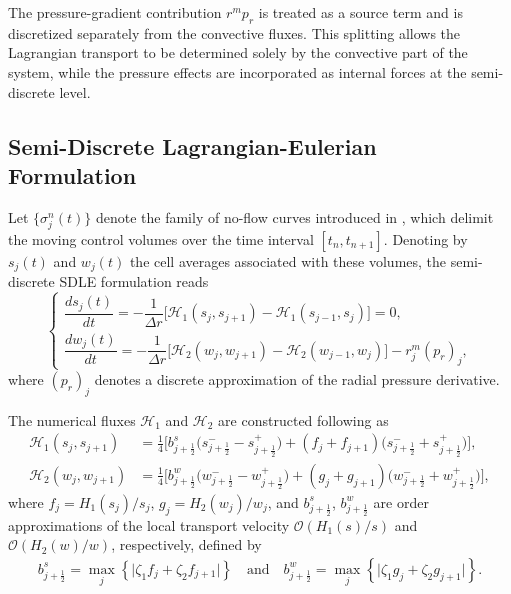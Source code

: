 \documentclass[11pt]{article}
\begin{document}
The pressure-gradient contribution $r^{m}p_{r}$ is treated as a source term and is discretized separately from the convective fluxes. This splitting allows the Lagrangian transport to be determined solely by the convective part of the system, while the pressure effects are incorporated as internal forces at the semi-discrete level.

\subsection*{Semi-Discrete Lagrangian-Eulerian Formulation}

Let $\{\sigma_j^n(t)\}$ denote the family of no-flow curves introduced in \cite{ABREU_LE_LINEAR}, which delimit the moving control volumes over the time interval $[t_n,t_{n+1}]$. Denoting by $s_j(t)$ and $w_j(t)$ the cell averages associated with these volumes, the semi-discrete SDLE formulation reads
\begin{equation}
\begin{cases}
\dfrac{d s_j(t)}{dt}
= -\dfrac{1}{\Delta r}\Big[\mathcal{H}_{1}(s_j,s_{j+1})
- \mathcal{H}_{1}(s_{j-1},s_j)\Big] = 0, \\[2mm]
\dfrac{d w_j(t)}{dt}
= -\dfrac{1}{\Delta r}\Big[\mathcal{H}_{2}(w_j,w_{j+1})
- \mathcal{H}_{2}(w_{j-1},w_j)\Big]
- r_j^{m}(p_r)_j,
\end{cases}
\label{eq:sdle-semidiscrete}
\end{equation}
where $(p_r)_j$ denotes a discrete approximation of the radial pressure derivative.

The numerical fluxes $\mathcal{H}_1$ and $\mathcal{H}_2$ are constructed following \cite{ABREU_LE_LINEAR} as
\begin{align}
\mathcal{H}_{1}(s_j,s_{j+1})
&= \frac{1}{4}\Big[
b^{s}_{j+\frac12}\big(s^{-}_{j+\frac12}-s^{+}_{j+\frac12}\big)
+ (f_j+f_{j+1})\big(s^{-}_{j+\frac12}+s^{+}_{j+\frac12}\big)
\Big], \label{eq:fluxle1}\\
\mathcal{H}_{2}(w_j,w_{j+1})
&= \frac{1}{4}\Big[
b^{w}_{j+\frac12}\big(w^{-}_{j+\frac12}-w^{+}_{j+\frac12}\big)
+ (g_j+g_{j+1})\big(w^{-}_{j+\frac12}+w^{+}_{j+\frac12}\big)
\Big], \label{eq:fluxle2}
\end{align}
where $f_j=H_1(s_j)/s_j$, $g_j=H_2(w_j)/w_j$, and $b^{s}_{j+\frac12}$, $b^{w}_{j+\frac12}$ are order approximations of the local transport velocity $\mathcal{O}(H_{1}(s)/s)$ and $\mathcal{O}(H_{2}(w)/w)$, respectively, defined by
\begin{align}
    b^{s}_{j+\frac12} = \displaystyle\max_{j}\left\{\vert \zeta_{1}f_{j} + \zeta_{2}f_{j+1} \vert\right\} \quad \mbox{and} \quad b^{w}_{j+\frac12} = \displaystyle\max_{j}\left\{\vert \zeta_{1}g_{j} + \zeta_{2}g_{j+1} \vert\right\}.
\end{align}
\end{document}
